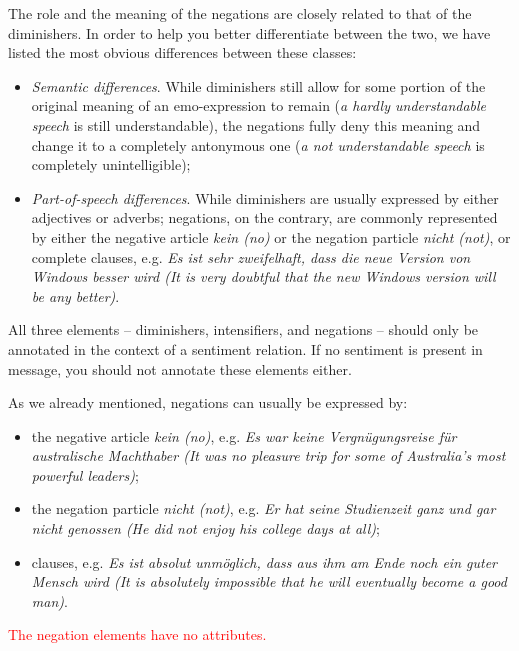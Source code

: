 \documentclass[11pt,a4paper]{article}
\begin{document}
The role and the meaning of the negations are closely related to that of the
diminishers.  In order to help you better differentiate between the two, we
have listed the most obvious differences between these classes:
\begin{itemize}
  \item\textit{Semantic differences}.  While diminishers still allow
    for some portion of the original meaning of an emo-expression to
    remain (\textit{a hardly understandable speech} is still
    understandable), the negations fully deny this meaning and change
    it to a completely antonymous one (\textit{a not understandable
      speech} is completely unintelligible);

  \item\textit{Part-of-speech differences}.  While diminishers are usually
    expressed by either adjectives or adverbs; negations, on the contrary, are
    commonly represented by either the negative article \textit{kein (no)} or
    the negation particle \textit{nicht (not)}, or complete clauses, e.g.
    \textit{Es ist sehr zweifelhaft, dass die neue Version von Windows besser
      wird (It is very doubtful that the new Windows version will be any
      better)}.

\end{itemize}
All three elements -- diminishers, intensifiers, and negations -- should only
be annotated in the context of a sentiment relation.  If no sentiment is
present in message, you should not annotate these elements either.

As we already mentioned, negations can usually be expressed by:
\begin{itemize}
  \item the negative article \textit{kein (no)}, e.g. \textit{Es war keine
    Vergn\"ugungsreise f\"ur australische Machthaber (It was no pleasure trip
    for some of Australia's most powerful leaders)};
  \item the negation particle \textit{nicht (not)}, e.g. \textit{Er hat seine
    Studienzeit ganz und gar nicht genossen (He did not enjoy his college days
    at all)};
  \item clauses, e.g. \textit{Es ist absolut unm\"oglich, dass aus ihm am Ende
    noch ein guter Mensch wird (It is absolutely impossible that he will
    eventually become a good man)}.
\end{itemize}
\textcolor{red}{The negation elements have no attributes.}
\end{document}
